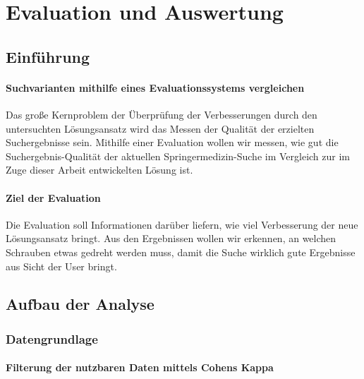 %
\chapter{Evaluation und Auswertung}
\label{sec:Evaluation}

\section{Einführung}
\label{sec:Evaluation:Einfuehrung}

\subsubsection{Suchvarianten mithilfe eines Evaluationssystems vergleichen}
\label{sec:Evaluation:Einfuehrung:Evaluationssystems}

Das große Kernproblem der Überprüfung der Verbesserungen durch den untersuchten Lösungsansatz wird das Messen der Qualität der erzielten Suchergebnisse sein. Mithilfe einer Evaluation wollen wir messen, wie gut die Suchergebnis-Qualität der aktuellen Springermedizin-Suche im Vergleich zur im Zuge dieser Arbeit entwickelten Lösung ist.

\subsubsection{Ziel der Evaluation}
\label{sec:Evaluation:Einfuehrung:Ziel}

Die Evaluation soll Informationen darüber liefern, wie viel Verbesserung der neue Lösungsansatz bringt. Aus den Ergebnissen wollen wir erkennen, an welchen \glqq Schrauben\grqq{} etwas gedreht werden muss, damit die Suche wirklich gute Ergebnisse aus Sicht der User bringt.

\section{Aufbau der Analyse}
\label{sec:Evaluation:Aufbau}

\subsection{Datengrundlage}
\label{sec:Evaluation:Aufbau:Datengrundlage}

\subsubsection{Filterung der nutzbaren Daten mittels Cohens Kappa}
\label{sec:Evaluation:Aufbau:Datengrundlage:EvaluationsdatenFiltern}

